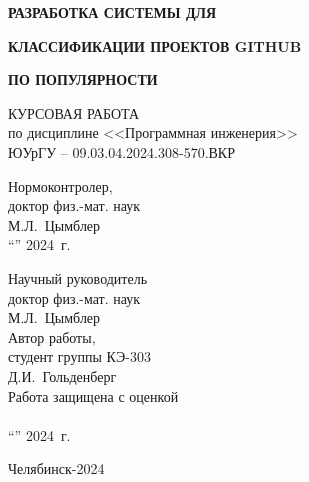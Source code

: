 \begin{adjustwidth}[]{0cm}{0cm}
\begin{center}
\begin{linespread}{1}




{
\large\textbf{РАЗРАБОТКА СИСТЕМЫ ДЛЯ }

\vspace{-5pt}

\large\textbf{КЛАССИФИКАЦИИ ПРОЕКТОВ GITHUB}

\vspace{-5pt}

\large\textbf{ПО ПОПУЛЯРНОСТИ}

}
\vspace{2em}

КУРСОВАЯ РАБОТА \\
по дисциплине <<Программная инженерия>>\\
ЮУрГУ -- 09.03.04.2024.308-570.ВКР



\parbox[t]{7cm}{
Нормоконтролер,\\[0.5em]
доктор физ.-мат. наук \\[0.5em]
\underfield{} М.Л.~Цымблер \\[0.5em]
``\underline{\qquad}''\underfield{} 2024~г.
}
\hfill{}
\parbox[t]{7cm}{
Научный руководитель \\
доктор физ.-мат. наук\\[0.5em]
\underfield{} М.Л.~Цымблер \\[2.5em]
Автор работы, \\
студент группы КЭ-303\\[0.5em]
\underfield{} Д.И.~Гольденберг \\[2.5em]
Работа защищена с оценкой \\[0.5em]
\underfield{}  \\[0.5em]
``\underline{\qquad}''\underfield{} 2024~г.

}


Челябинск-2024

\end{linespread}
\end{center}
\end{adjustwidth}

\pagebreak
